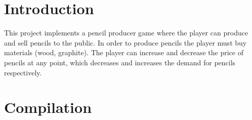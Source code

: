 \hypertarget{index_intro_sec}{}\section{Introduction}\label{index_intro_sec}
This project implements a pencil producer game where the player can produce and sell pencils to the public. In order to produce pencils the player must buy materials (wood, graphite). The player can increase and decrease the price of pencils at any point, which decreases and increases the demand for pencils respectively. \hypertarget{index_compile_sec}{}\section{Compilation}\label{index_compile_sec}

 